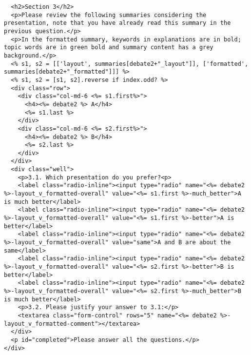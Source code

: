 \documentclass{article}
\begin{document}
\begin{verbatim}
  <h2>Section 3</h2>
  <p>Please review the following summaries considering the presentation, note that you have already read this summary in the previous question.</p>
  <p>In the formatted summary, keywords in explanations are in bold; topic words are in green bold and summary content has a grey background.</p>
  <% s1, s2 = [['layout', summaries[debate2+"_layout"]], ['formatted', summaries[debate2+"_formatted"]]] %>
  <% s1, s2 = [s1, s2].reverse if index.odd? %>
  <div class="row">
    <div class="col-md-6 <%= s1.first%>">
      <h4><%= debate2 %> A</h4>
      <%= s1.last %>
    </div>
    <div class="col-md-6 <%= s2.first%>">
      <h4><%= debate2 %> B</h4>
      <%= s2.last %>
    </div>
  </div>
  <div class="well">
    <p>3.1. Which presentation do you prefer?<p>
    <label class="radio-inline"><input type="radio" name="<%= debate2 %>-layout_v_formatted-overall" value="<%= s1.first %>-much_better">A is much better</label>
    <label class="radio-inline"><input type="radio" name="<%= debate2 %>-layout_v_formatted-overall" value="<%= s1.first %>-better">A is better</label>
    <label class="radio-inline"><input type="radio" name="<%= debate2 %>-layout_v_formatted-overall" value="same">A and B are about the same</label>
    <label class="radio-inline"><input type="radio" name="<%= debate2 %>-layout_v_formatted-overall" value="<%= s2.first %>-better">B is better</label>
    <label class="radio-inline"><input type="radio" name="<%= debate2 %>-layout_v_formatted-overall" value="<%= s2.first %>-much_better">B is much better</label>
    <p>3.2. Please justify your answer to 3.1:</p>
    <textarea class="form-control" rows="5" name="<%= debate2 %>-layout_v_formatted-comment"></textarea>
  </div>
  <p id="completed">Please answer all the questions.</p>
</div>


\end{verbatim}
\pagebreak
\end{document}
